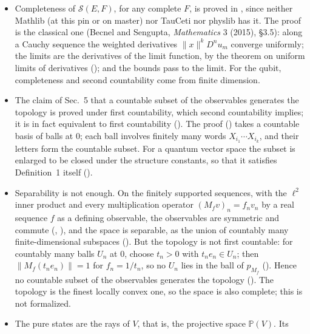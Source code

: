 \documentclass[11pt]{article}
\begin{document}
\begin{itemize}
  product of copies of $L^2(\mathbb{R})$ through $f \mapsto (x^a \partial^b f)_{a,b}$
  (). The topology of $\mathcal{S}(\mathbb{R})$ is induced by this map,
  because it is given by the $L^2$ seminorms ().
\item Completeness of $\mathcal{S}(E, F)$, for any complete $F$, is proved in
  , since neither Mathlib (at this pin or on master) nor TauCeti nor physlib
  has it. The proof is the classical one (Becnel and Sengupta, \emph{Mathematics} 3 (2015),
  \S3.5): along a Cauchy sequence the weighted derivatives $\|x\|^k D^n u_m$ converge
  uniformly; the limits are the derivatives of the limit function, by the theorem on uniform
  limits of derivatives (); and the bounds pass to the
  limit. For the qubit, completeness and second countability come from finite dimension.
\item The claim of Sec.~5 that a countable subset of the observables generates the topology is
  proved under first countability, which second countability implies; it is in fact equivalent
  to first countability (). The proof
  () takes a countable basis of balls at $0$; each ball
  involves finitely many words $X_{i_1} \cdots X_{i_k}$, and their letters form the countable
  subset. For a quantum vector space the subset is enlarged to be closed under the structure
  constants, so that it satisfies Definition~1 itself
  ().
\item Separability is not enough. On the finitely supported sequences, with the $\ell^2$ inner
  product and every multiplication operator $(M_f v)_n = f_n v_n$ by a real sequence $f$ as a
  defining observable, the observables are symmetric and commute (,
  ), and the space is separable, as the union of countably many
  finite-dimensional subspaces (). But the topology is not first
  countable: for countably many balls $U_n$ at $0$, choose $t_n > 0$ with $t_n e_n \in U_n$; then
  $\|M_f(t_n e_n)\| = 1$ for $f_n = 1/t_n$, so no $U_n$ lies in the ball of $p_{M_f}$
  (). Hence no countable subset of the observables
  generates the topology (). The topology is the finest
  locally convex one, so the space is also complete; this is not formalized.
\item The pure states are the rays of $V$, that is, the projective space $\mathbb{P}(V)$. Its

\end{itemize}
\end{document}
